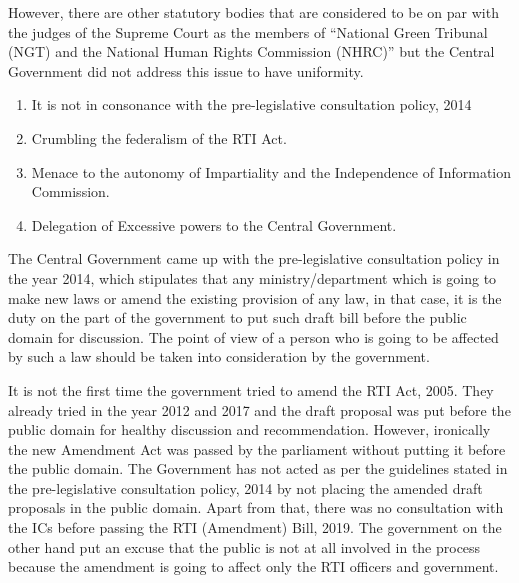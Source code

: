 \begin{multicols}{2}
\begin{enumerate}
However, there are other statutory bodies that are considered to be on par with the
judges of the Supreme Court as the members of “National Green Tribunal (NGT) and
the National Human Rights Commission (NHRC)” but the Central Government did
not address this issue to have uniformity.
\end{enumerate}

\begin{enumerate}
\item It is not in consonance with the pre-legislative consultation policy, 2014

\item Crumbling the federalism of the RTI Act.

\item Menace to the autonomy of Impartiality and the Independence of Information Commission.

\item Delegation of Excessive powers to the Central Government. 
\end{enumerate}


\noi
The Central Government came up with the pre-legislative consultation policy in the year
2014, which stipulates that any ministry/department which is going to make new laws or
amend the existing provision of any law, in that case, it is the duty on the part of the
government to put such draft bill before the public domain for discussion. The point of view
of a person who is going to be affected by such a law should be taken into consideration by
the government.

\noi
It is not the first time the government tried to amend the RTI Act, 2005. They already tried in
the year 2012 and 2017 and the draft proposal was put before the public domain for healthy
discussion and recommendation. However, ironically the new Amendment Act was passed by
the parliament without putting it before the public domain. The Government has not acted as
per the guidelines stated in the pre-legislative consultation policy, 2014 by not placing the
amended draft proposals in the public domain. Apart from that, there was no consultation
with the ICs before passing the RTI (Amendment) Bill, 2019. The government on the other
hand put an excuse that the public is not at all involved in the process because the amendment
is going to affect only the RTI officers and government.



\end{multicols}
